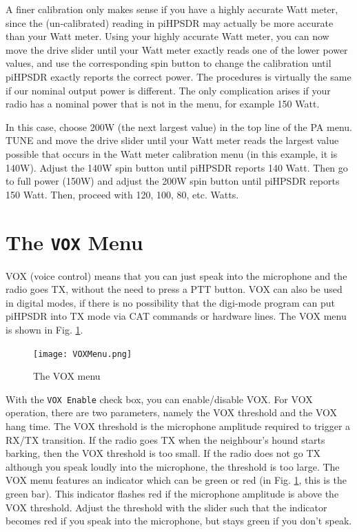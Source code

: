 \documentclass[12pt]{book}
\def\rett#1{\texttt{\color{red}#1}}
\def\pH{pi\-HPSDR\xspace}
\begin{document}
A finer calibration only makes sense if you have a highly accurate Watt meter, since
the (un-calibrated) reading in \pH may actually be more accurate than your
Watt meter. Using your highly accurate Watt meter,
you can now move the drive slider until your Watt meter exactly reads one of the
lower power values, and use the corresponding spin button to change the calibration
until \pH exactly reports the correct power.
The procedures is  virtually the same if our nominal output power is different.
The only complication arises if your radio has a nominal power that is not in the menu,
for example 150 Watt.

In this case, choose 200W (the next largest value)
in the top line of the PA menu. TUNE and move the drive
slider until your Watt meter reads the largest value possible that occurs
in the Watt meter calibration menu (in this example, it is 140W). Adjust the
140W spin button until \pH reports 140 Watt. Then go to full power
(150W) and adjust the 200W spin button until \pH reports 150 Watt.
Then, proceed with 120, 100, 80, etc. Watts.

\section{The \texttt{VOX} Menu}

VOX (voice control) means that you can just speak into the microphone and the
radio goes TX, without the need to press a PTT button. VOX can also be used
in digital modes, if there is no possibility that the digi-mode program can
put \pH into TX mode via CAT commands or hardware lines. The VOX menu
is shown in Fig. \ref{fig:VOXMenu}.

\begin{figure}[ht]
\center
\texttt{[image: VOXMenu.png]}
\caption{The VOX menu}
\label{fig:VOXMenu}
\end{figure}

With the \rett{VOX Enable} check box, you can enable/disable VOX. For VOX operation,
there are two parameters, namely the VOX threshold and the VOX hang time. The VOX threshold
is the microphone amplitude required to trigger a RX/TX transition. If the radio goes TX
when the neighbour's hound starts barking, then the VOX threshold is too small. If the radio
does not go TX  although you speak loudly into the microphone, the threshold is too large.
The VOX menu features an indicator which can be green or red (in Fig. \ref{fig:VOXMenu}, this
is the green bar). This indicator flashes red if the microphone amplitude is above the VOX
threshold. Adjust the threshold with the slider such that the indicator becomes red if  you
speak into the microphone, but stays green if you don't speak.
\end{document}
